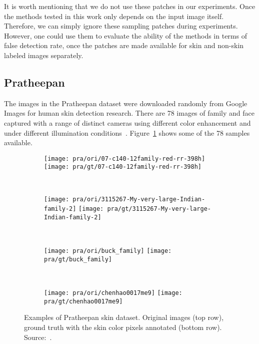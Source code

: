 It is worth mentioning that we do not use these patches in our experiments. Once the methods tested in this work only depends on the input image itself. Therefore, we can simply ignore these sampling patches during experiments. However, one could use them to evaluate the ability of the methods in terms of false detection rate, once the patches are made available for skin and non-skin labeled images separately.


\subsection{Pratheepan}
\label{sec:datasets_pratheepan}
The images in the Pratheepan dataset were downloaded randomly from Google Images for human skin detection research. There are 78 images of family and face captured with a range of distinct cameras using different color enhancement and under different illumination conditions~\cite{tan:12}. Figure~\ref{fig:pra_dataset_exemplo} shows some of the 78 samples available.

\begin{figure}[H]
    \centering
    \begin{subfigure}[t]{0.238\textwidth}
        \texttt{[image: pra/ori/07-c140-12family-red-rr-398h]}
        \texttt{[image: pra/gt/07-c140-12family-red-rr-398h]}
    \end{subfigure}
    ~
    \begin{subfigure}[t]{0.25\textwidth}
        \texttt{[image: pra/ori/3115267-My-very-large-Indian-family-2]}
        \texttt{[image: pra/gt/3115267-My-very-large-Indian-family-2]}
    \end{subfigure}
    ~
    \begin{subfigure}[t]{0.25\textwidth}
        \texttt{[image: pra/ori/buck\_family]}
        \texttt{[image: pra/gt/buck\_family]}
    \end{subfigure}
    ~
    \begin{subfigure}[t]{0.141\textwidth}
        \texttt{[image: pra/ori/chenhao0017me9]}
        \texttt{[image: pra/gt/chenhao0017me9]}
    \end{subfigure}
    \caption[Examples of Pratheepan skin dataset]{Examples of Pratheepan skin dataset. Original images (top row), ground truth with the skin color pixels annotated (bottom row). Source:~\citet{tan:12}.}
    \label{fig:pra_dataset_exemplo}
\end{figure}


